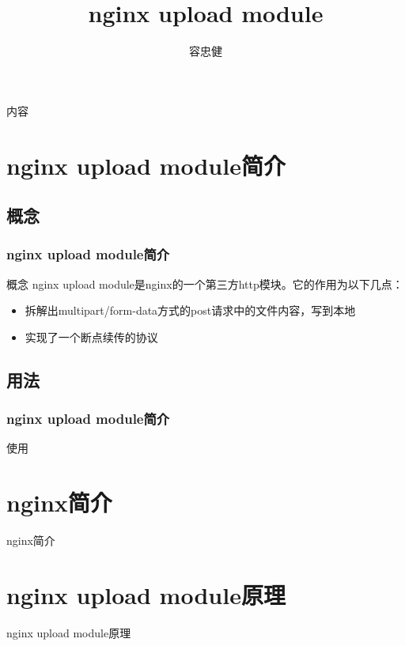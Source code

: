 \documentclass[aspectratio=169,hideallsubsections]{ctexbeamer}
\title{nginx upload module}
\author{容忠健}
\institute{@Bigo}
\begin{document}
\frame[plain]{\titlepage}

\begin{frame}{内容}
  \tableofcontents[hideallsubsections]
\end{frame}

\section{nginx upload module简介}
\subsection*{概念}
\begin{frame}[fragile]
  \frametitle{nginx upload module简介}{概念}
  \pause
  nginx upload module是nginx的一个第三方http模块。它的作用为以下几点：
\begin{itemize}
  \pause
\item 拆解出multipart/form-data方式的post请求中的文件内容，写到本地
  \pause
\item 实现了一个断点续传的协议
\end{itemize}
\end{frame}

\subsection*{用法}
\begin{frame}
  \frametitle{nginx upload module简介}{使用}
\end{frame}


\section{nginx简介}
\begin{frame}{nginx简介}
\end{frame}

\section{nginx upload module原理}
\begin{frame}{nginx upload module原理}
\end{frame}
\end{document}
